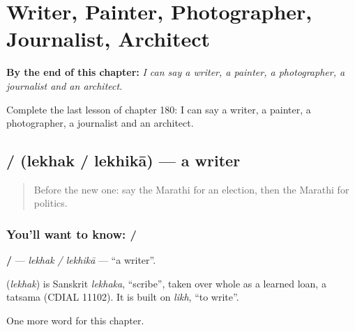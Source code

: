 
\chapter{Writer, Painter, Photographer, Journalist, Architect}
\label{ch:mr-writer-painter-photographer-journalist-architect}

\begin{chapteropening}
\textbf{By the end of this chapter:} \emph{I can say a writer, a painter, a photographer, a journalist and an architect.}

Complete the last lesson of chapter 180: I can say a writer, a painter, a photographer, a journalist and an architect.
\end{chapteropening}

\section[\texorpdfstring{\mr{लेखक} / \mr{लेखिका} (lekhak / lekhikā)}{लेखक / लेखिका (lekhak / lekhikā)}]{ /  (lekhak / lekhikā) — a writer}

\label{lesson:MR-C180-lekhak}



\begin{quote}
Before the new one: say the Marathi for an election, then the Marathi for politics.
\end{quote}

\subsection*{You'll want to know:  / }
\textbf{ / } — \emph{lekhak / lekhikā} — \textquotedblleft{}a writer\textquotedblright{}.

\begin{cousinweb}
\textbf{} (\emph{lekhak}) is Sanskrit \emph{lekhaka}, \textquotedblleft{}scribe\textquotedblright{}, taken over whole as a learned loan, a tatsama (CDIAL 11102). It is built on \emph{likh}, \textquotedblleft{}to write\textquotedblright{}.
\end{cousinweb}

\begin{grammarlens}[title={What you've built}]
One more word for this chapter.
\end{grammarlens}

